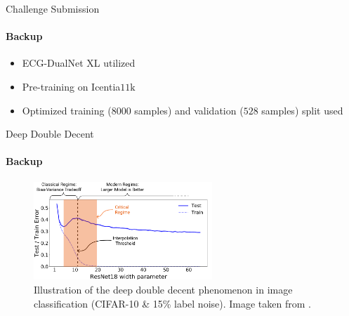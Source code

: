 \begin{frame}{Challenge Submission}
\framesubtitle{Backup}
    \begin{itemize}
        \item ECG-DualNet XL utilized
        \item Pre-training on Icentia$11\si{\kilo}$
        \item Optimized training ($8000$ samples) and validation ($528$ samples) split used
    \end{itemize}
    \begin{table}[!ht]
        \centering
        \caption{Classification results of ECG-DualNet XL pre-trained on the Icentia$11$k dataset and fine-tuned on the PhysioNet dataset with optimized submission split. Metric computed on the small validation set. Four class results on the top and two class results below.}
        
        \label{tab:results_challenge}
    \end{table}
    \begin{center}
        \hspace{-0.15cm}
    \end{center}
\end{frame}

\begin{frame}{Deep Double Decent}
\framesubtitle{Backup}
    \begin{figure}[!ht]
        \centering
        \vspace{-0.2cm}
        \includegraphics[width=0.6\textwidth]{artwork/deep_double_decent.png}
        \vspace{-0.2cm}
        \caption{Illustration of the deep double decent phenomenon in image classification (CIFAR-10 \& 15\% label noise). Image taken from \cite{Nakkiran2020}.}
        \label{fig:ddd}
    \end{figure}
\end{frame}